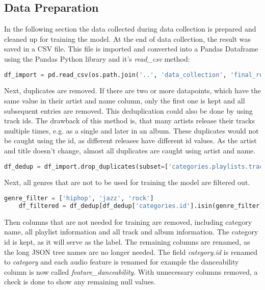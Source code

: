 \subsection{Data Preparation}

In the following section the data collected during data collection is prepared and cleaned up for training 
the model. At the end of data collection, the result was saved in a CSV file. This file is imported and converted
into a Pandas Dataframe using the Pandas Python library and it's \emph{read\_csv} method:

\begin{lstlisting}[language=Python]
    df_import = pd.read_csv(os.path.join('..', 'data_collection', 'final_result.csv'))
\end{lstlisting}

Next, duplicates are removed. If there are two or more datapoints, which have the same value in their artist
and name column, only the first one is kept and all subsequent entries are removed.
This deduplication could also be done by using track ids. The drawback of this method is, that many artists
release their tracks multiple times, e.g. as a single and later in an album. These duplicates would not be
caught using the id, as different releases have different id values. As the artist and title doesn't change, almost
all duplicates are caught using artist and name.

\begin{lstlisting}[language=Python]
    df_dedup = df_import.drop_duplicates(subset=['categories.playlists.tracks.artists', 'categories.playlists.tracks.name'])
\end{lstlisting}

Next, all genres that are not to be used for training the model are filtered out.

\begin{lstlisting}[language=Python]
    genre_filter = ['hiphop', 'jazz', 'rock']
    df_filtered = df_dedup[df_dedup['categories.id'].isin(genre_filter)]
\end{lstlisting}

Then columns that are not needed for training are removed, including category name, all playlist information and
all track and album information. The category id is kept, as it will serve as the label.
The remaining columns are renamed, as the long JSON tree names are no longer needed.
The field \emph{category.id} is renamed to \emph{category} and each audio feature is renamed for example 
the danceability column is now called \emph{feature\_danceability}.
With unnecessary columns removed, a check is done to show any remaining null values.

